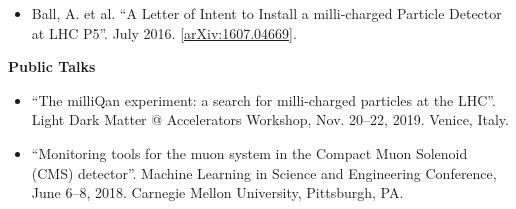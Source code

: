\begin{vitae}
\begin{itemize}
\item Ball, A. et al. ``A Letter of Intent to Install a milli-charged Particle Detector at LHC P5''. July 2016.
  [\href{https://arxiv.org/abs/1607.04669}{arXiv:1607.04669}].

\end{itemize}


\vspace{0.2cm}
\textbf{Public Talks}

\begin{itemize}

\item ``The milliQan experiment: a search for milli-charged particles at the LHC''.
Light Dark Matter @ Accelerators Workshop, Nov. 20--22, 2019. Venice, Italy.

\item ``Monitoring tools for the muon system in the Compact Muon Solenoid (CMS) detector''.
Machine Learning in Science and Engineering Conference, June 6--8, 2018. Carnegie Mellon
University, Pittsburgh, PA.

\end{itemize}

\end{vitae}
